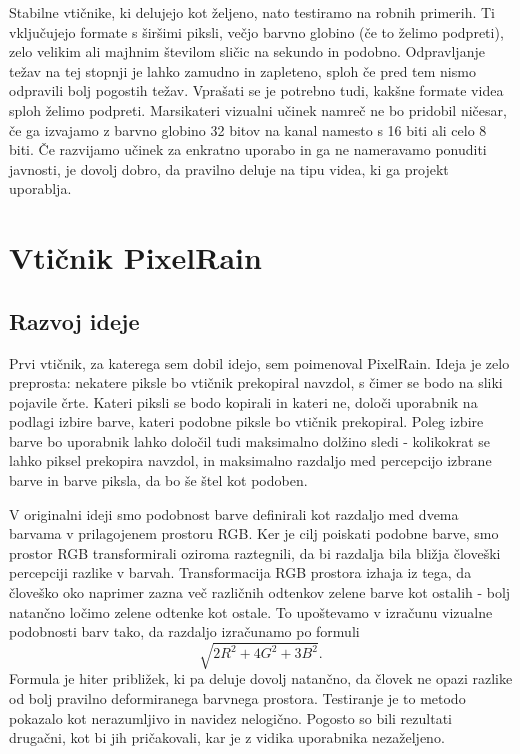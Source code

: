 \documentclass[a4paper, 12pt]{book}
\begin{document}
Stabilne vtičnike, ki delujejo kot željeno, nato testiramo na robnih primerih.
Ti vključujejo formate s širšimi piksli, večjo barvno globino (če to želimo podpreti), zelo velikim ali majhnim številom sličic na sekundo in podobno.
Odpravljanje težav na tej stopnji je lahko zamudno in zapleteno, sploh če pred tem nismo odpravili bolj pogostih težav.
Vprašati se je potrebno tudi, kakšne formate videa sploh želimo podpreti.
Marsikateri vizualni učinek namreč ne bo pridobil ničesar, če ga izvajamo z barvno globino 32 bitov na kanal namesto s 16 biti ali celo 8 biti.
Če razvijamo učinek za enkratno uporabo in ga ne nameravamo ponuditi javnosti, je dovolj dobro, da pravilno deluje na tipu videa, ki ga projekt uporablja.



\section{Vtičnik PixelRain}

\subsection{Razvoj ideje}
Prvi vtičnik, za katerega sem dobil idejo, sem poimenoval PixelRain. 
Ideja je zelo preprosta: nekatere piksle bo vtičnik prekopiral navzdol, s čimer se bodo na sliki pojavile črte.
Kateri piksli se bodo kopirali in kateri ne, določi uporabnik na podlagi izbire barve, kateri podobne piksle bo vtičnik prekopiral.
Poleg izbire barve bo uporabnik lahko določil tudi maksimalno dolžino sledi - kolikokrat se lahko piksel prekopira navzdol,
in maksimalno razdaljo med percepcijo izbrane barve in barve piksla, da bo še štel kot podoben.

V originalni ideji smo podobnost barve definirali kot razdaljo med dvema barvama v prilagojenem prostoru RGB.
Ker je cilj poiskati podobne barve, smo prostor RGB transformirali oziroma raztegnili, da bi razdalja bila bližja človeški percepciji razlike v barvah.
Transformacija RGB prostora izhaja iz tega, da človeško oko naprimer zazna več različnih odtenkov zelene barve kot ostalih - bolj natančno ločimo zelene odtenke kot ostale.
To upoštevamo v izračunu vizualne podobnosti barv tako, da razdaljo izračunamo po formuli\cite{colordiff2} $$ \sqrt{ 2 R^2 + 4 G^2 + 3 B^2 } . $$ 
Formula je hiter približek, ki pa deluje dovolj natančno, da človek ne opazi razlike od bolj pravilno deformiranega barvnega prostora.
Testiranje je to metodo pokazalo kot nerazumljivo in navidez nelogično.
Pogosto so bili rezultati drugačni, kot bi jih pričakovali, kar je z vidika uporabnika nezaželjeno\cite{upoprogopr}.
\end{document}
